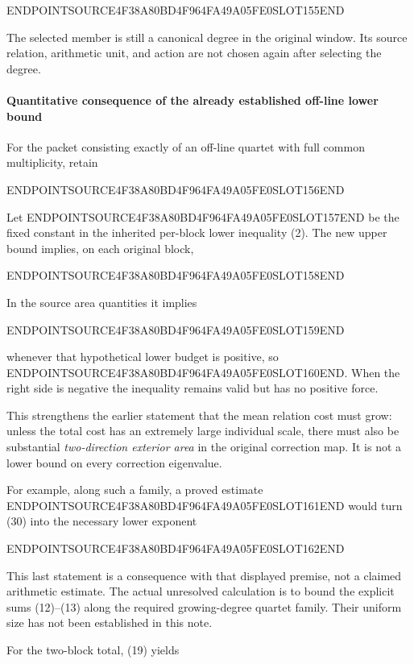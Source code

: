 ENDPOINTSOURCE4F38A80BD4F964FA49A05FE0SLOT155END

The selected member is still a canonical degree in the original window. Its source relation, arithmetic unit, and action are not chosen again after selecting the degree.

\paragraph{Quantitative consequence of the already established off-line lower bound}\label{endpoint-relation_moment_original--quantitative-consequence-of-the-already-established-off-line-lower-bound}

For the packet consisting exactly of an off-line quartet with full common multiplicity, retain

ENDPOINTSOURCE4F38A80BD4F964FA49A05FE0SLOT156END

Let ENDPOINTSOURCE4F38A80BD4F964FA49A05FE0SLOT157END be the fixed constant in the inherited per-block lower inequality (2). The new upper bound implies, on each original block,

ENDPOINTSOURCE4F38A80BD4F964FA49A05FE0SLOT158END

In the source area quantities it implies

ENDPOINTSOURCE4F38A80BD4F964FA49A05FE0SLOT159END

whenever that hypothetical lower budget is positive, so ENDPOINTSOURCE4F38A80BD4F964FA49A05FE0SLOT160END. When the right side is negative the inequality remains valid but has no positive force.

This strengthens the earlier statement that the mean relation cost must grow: unless the total cost has an extremely large individual scale, there must also be substantial \emph{two-direction exterior area} in the original correction map. It is not a lower bound on every correction eigenvalue.

For example, along such a family, a proved estimate ENDPOINTSOURCE4F38A80BD4F964FA49A05FE0SLOT161END would turn (30) into the necessary lower exponent

ENDPOINTSOURCE4F38A80BD4F964FA49A05FE0SLOT162END

This last statement is a consequence with that displayed premise, not a claimed arithmetic estimate. The actual unresolved calculation is to bound the explicit sums (12)--(13) along the required growing-degree quartet family. Their uniform size has not been established in this note.

For the two-block total, (19) yields

